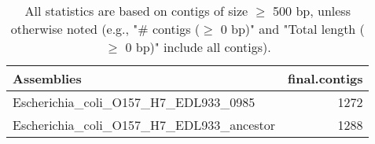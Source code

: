 \documentclass[12pt,a4paper]{article}
\begin{document}
\begin{table}[ht]
\begin{center}
\caption{All statistics are based on contigs of size $\geq$ 500 bp, unless otherwise noted (e.g., "\# contigs ($\geq$ 0 bp)" and "Total length ($\geq$ 0 bp)" include all contigs).}
\begin{tabular}{|l*{1}{|r}|}
\hline
Assemblies & final.contigs \\ \hline
Escherichia\_coli\_O157\_H7\_EDL933\_0985 & 1272 \\ \hline
Escherichia\_coli\_O157\_H7\_EDL933\_ancestor & 1288 \\ \hline
\end{tabular}
\end{center}
\end{table}
\end{document}
